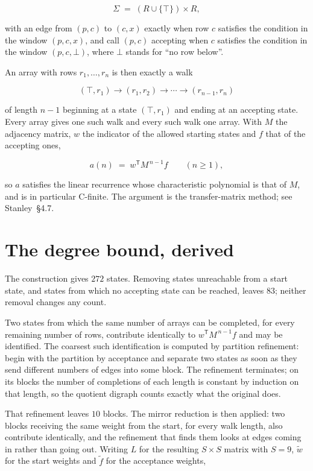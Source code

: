\documentclass[11pt]{article}
\theoremstyle{definition}
\begin{document}
\[\Sigma \;=\; (R \cup \{\top\}) \times R,\]

with an edge from $(p,c)$ to $(c,x)$ exactly when row $c$ satisfies the condition in the window $(p,c,x)$, and call $(p,c)$ accepting when $c$ satisfies the condition in the window $(p,c,\bot)$, where $\bot$ stands for ``no row below''.

An array with rows $r_1,\dots,r_n$ is then exactly a walk

\[(\top,r_1) \to (r_1,r_2) \to \cdots \to (r_{n-1},r_n)\]

of length $n-1$ beginning at a state $(\top,r_1)$ and ending at an accepting state. Every array gives one such walk and every such walk one array. With $M$ the adjacency matrix, $w$ the indicator of the allowed starting states and $f$ that of the accepting ones,

\[a(n) \;=\; w^{\mathsf T} M^{\,n-1} f \qquad (n \ge 1),\]

so $a$ satisfies the linear recurrence whose characteristic polynomial is that of $M$, and is in particular C-finite. The argument is the transfer-matrix method; see Stanley~\S4.7.

\section{The degree bound, derived}

The construction gives $272$ states. Removing states unreachable from a start state, and states from which no accepting state can be reached, leaves $83$; neither removal changes any count.

Two states from which the same number of arrays can be completed, for every remaining number of rows, contribute identically to $w^{\mathsf T}M^{\,n-1}f$ and may be identified. The coarsest such identification is computed by partition refinement: begin with the partition by acceptance and separate two states as soon as they send different numbers of edges into some block. The refinement terminates; on its blocks the number of completions of each length is constant by induction on that length, so the quotient digraph counts exactly what the original does.

That refinement leaves $10$ blocks. The mirror reduction is then applied: two blocks receiving the same weight from the start, for every walk length, also contribute identically, and the refinement that finds them looks at edges coming in rather than going out. Writing $L$ for the resulting $S \times S$ matrix with $S = 9$, $\tilde w$ for the start weights and $\tilde f$ for the acceptance weights,
\end{document}
